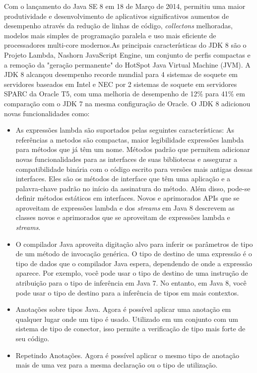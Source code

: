 Com o lançamento do Java SE 8 em 18 de Março de 2014, permitiu uma maior produtividade e desenvolvimento de aplicativos significativos aumentos de desempenho através da redução de linhas de código, {\it collectons} melhoradas, modelos mais simples de programação paralela e uso mais eficiente de processadores multi-core modernos.As principais características do \acs{JDK} 8 são o Projeto Lambda, Nashorn JavaScript Engine, um conjunto de perfis compactas e a remoção da "geração permanente" do HotSpot Java Virtual Machine (\acs{JVM}). A \acs{JDK} 8 alcançou desempenho recorde mundial para 4 sistemas de soquete em servidores baseados em Intel e NEC por 2 sistemas de soquete em servidores SPARC da Oracle T5, com uma melhoria de desempenho de 12\% para 41\% em comparação com o JDK 7 na mesma configuração de Oracle.
O \acs{JDK} 8 adicionou novas funcionalidades como:
  \begin{itemize}
  \item As expressões lambda são suportados pelas seguintes características: As referências a metodos são compactas, maior legibilidade expressões lambda para métodos que já têm um nome. Métodos padrão que permitem adicionar novas funcionalidades para as interfaces de suas bibliotecas e assegurar a compatibilidade binária com o código escrito para versões mais antigas dessas interfaces. Eles são os métodos de interface que têm uma aplicação e a palavra-chave padrão no início da assinatura do método. Além disso, pode-se definir métodos estáticos em interfaces. Novos e aprimorados APIs que se aproveitam de expressões lambda e dos {\it streams} em Java 8 descrevem as classes novos e aprimorados que se aproveitam de expressões lambda e {\it streams}.
  \item O compilador Java aproveita digitação alvo para inferir os parâmetros de tipo de um método de invocação genérica. O tipo de destino de uma expressão é o tipo de dados que o compilador Java espera, dependendo de onde a expressão aparece. Por exemplo, você pode usar o tipo de destino de uma instrução de atribuição para o tipo de inferência em Java 7. No entanto, em Java 8, você pode usar o tipo de destino para a inferência de tipos em mais contextos.
  \item Anotações sobre tipos Java. Agora é possível aplicar uma anotação em qualquer lugar onde um tipo é usado. Utilizado em um conjunto com um sistema de tipo de conector, isso permite a verificação de tipo mais forte de seu código.
  \item  Repetindo Anotações. Agora é possível aplicar o mesmo tipo de anotação mais de uma vez para a mesma declaração ou o tipo de utilização.
  \end{itemize}


								